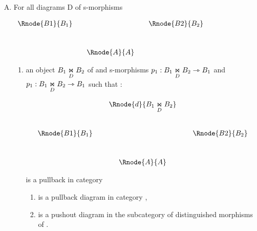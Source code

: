 \documentclass[10pt,a4paper]{scrartcl}
\begin{document}
\begin{enumerate} [A.,leftmargin=0.5cm]
\begin{oldtt}
\begin{enumerate}[label*=\arabic*]
is a limit of diagram $D$ in category  and 
\item 
{}
such that for any cone $\tuple{N,\psi}$ to diagram $D$
the mediating morphism $h: N \morph B \underset{D}{\Join} B'$ is a d-morphism iff 
the characteristic diagram of the cone $\tuple{N,\psi}$ factors through $D$.


\end{enumerate}
\end{oldtt}
	\item {} For all diagrams D of s-morphisms 
	\begin{center}
$
\begin{array}{cp{0cm}cp{0cm}c}
\Rnode{B1}{B_1}& &            &  &\Rnode{B2}{B_2} \\ [1.0cm]
               & &\Rnode{A}{A}& &
\end{array}
$
\end{center}
\begin{enumerate}[label*=\arabic*]
\item	
an object  $ \fibrex{B_1}{B_2}{D}$ of  and s-morphisms
$p_1: \fibrex{B_1}{B_2}{D} \smorph B_1$ and  $p_1: \fibrex{B_1}{B_2}{D} \smorph B_1$ such that :

\begin{center}
\begin{displaymath}
\begin{array}{cp{0.1cm}cp{0.1cm} c}
            & &\Rnode{d}{\fibrex{B_1}{B_2}{D}}                  \\ [1.0cm]
\Rnode{B1}{B_1}& &                & & \Rnode{B2}{B_2}           \\ [1.0cm]
                   & &\Rnode{A}{A}& &
\end{array}
\end{displaymath}
 
\end{center}

is a pullback in category 
\begin{oldtt}
\begin{enumerate}[label*=.\arabic*]
\item {} is a pullback diagram in category ,
\item {}  is a pushout diagram in the subcategory of distinguished morphisms of .
\end{enumerate}
\end{oldtt}


\end{enumerate}
\end{enumerate}
\end{document}
